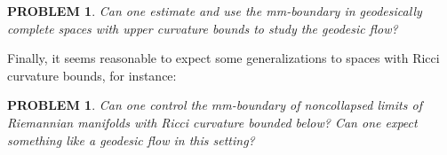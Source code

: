 \documentclass[12pt,leqno,intlimits]{amsart}
\numberwithin{equation}{section}
\newtheorem{quest}[thm]{PROBLEM}
\theoremstyle{definition}
\theoremstyle{remark}
\begin{document}
  
\begin{quest}  \label{qe:CAT}
Can one estimate and use the mm-boundary in geodesically complete spaces with upper curvature bounds to study the geodesic flow?
\end{quest}

Finally, it seems reasonable to expect some generalizations to spaces with Ricci curvature bounds, for instance:


\begin{quest}
Can one control the mm-boundary of noncollapsed limits of Riemannian manifolds with Ricci curvature bounded below? Can one expect something like a geodesic flow in this setting? 
\end{quest}



\end{document}

